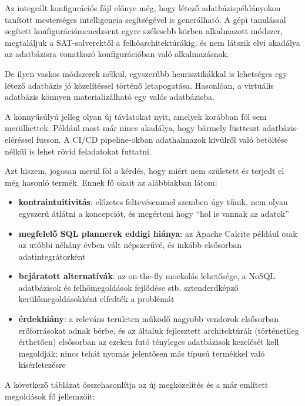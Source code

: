 \documentclass[
    parspace,
    noindent,
    nohyp,
]{elteiktdk}[2023/04/10]
\begin{document}
Az integrált konfigurációs fájl előnye még,
hogy létező adatbázispéldányokon tanított mesterséges intelligencia segítségével is generálható.
A gépi tanulással segített konfigurációmenedzsent egyre szélesebb körben alkalmazott módszer,
megtaláljuk a SAT-solverektől\cite{Hoos2021AutomatedCA} a felhőarchitektúrákig\cite{Osypanka2022ResourceUC},
és nem látszik elvi akadálya az adatbázisra vonatkozó konfigurációban való alkalmazásnak.

De ilyen vaskos módszerek nélkül, egyszerűbb heurisztikákkal is lehetséges
egy létező adatbázis jó közelítéssel történő letapogatása.
Hasonlóan, a virtuális adatbázis könnyen materializálható egy valós adatbázisba.

A könnyűsúlyú jelleg olyan új távlatokat nyit, amelyek korábban föl sem merülhettek.
Például most már nincs akadálya, hogy bármely füstteszt adatbázis-eléréssel fusson.
A CI/CD pipeline-okban adathalmazok kívülről való betöltése nélkül is lehet rövid feladatokat futtatni.

Azt hiszem, jogosan merül föl a kérdés, hogy miért nem született és terjedt el még hasonló termék.
Ennek fő okait az alábbiakban látom:

\begin{itemize}
    \item \textbf{kontraintuitivitás}: előzetes feltevésemmel szemben úgy tűnik,
          nem olyan egyszerű átlátni a koncepciót, és megérteni hogy ``hol is vannak az adatok''
    \item \textbf{megfelelő SQL plannerek eddigi hiánya}: az Apache Calcite például
          csak az utóbbi néhány évben vált népszerűvé, és inkább elsősorban adatintegrátorként
    \item \textbf{bejáratott alternatívák}: az on-the-fly mockolás lehetősége,
          a NoSQL adatbázisok és felhőmegoldások fejlődése stb.
          sztenderdképző kerülőmegoldásokként elfedték a problémát
    \item \textbf{érdekhiány}: a releváns területen működő nagyobb vendorok elsősorban
          erőforrásokat adnak bérbe, és az általuk fejlesztett architektúrák (történetileg érthetően)
          elsősorban az ezeken futó tényleges adatbázisok kezelését kell megoldják;
          nincs tehát nyomás jelentősen más típusú termékkel való kísérletezésre
\end{itemize}

A következő táblázat összehasonlítja az új megközelítés és a már említett megoldások fő jellemzőit:
\end{document}
